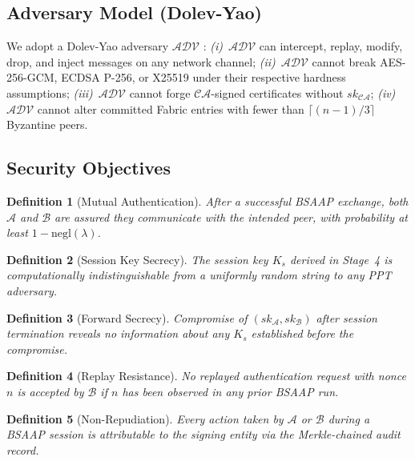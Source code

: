 \documentclass[review,5p,twocolumn,times]{elsarticle}
\newtheorem{definition}{Definition}[section]
\begin{document}
\subsection{Adversary Model (Dolev-Yao)}

We adopt a Dolev-Yao adversary $\mathcal{ADV}$ \cite{dolev1983security}:
\emph{(i)}~$\mathcal{ADV}$ can intercept, replay, modify, drop, and inject
messages on any network channel;
\emph{(ii)}~$\mathcal{ADV}$ cannot break AES-256-GCM, ECDSA P-256, or X25519
under their respective hardness assumptions;
\emph{(iii)}~$\mathcal{ADV}$ cannot forge $\mathcal{CA}$-signed certificates
without $sk_{\mathcal{CA}}$;
\emph{(iv)}~$\mathcal{ADV}$ cannot alter committed Fabric entries with fewer
than $\lceil(n-1)/3\rceil$ Byzantine peers.

\subsection{Security Objectives}

\begin{definition}[Mutual Authentication]\label{def:auth}
After a successful BSAAP exchange, both $\mathcal{A}$ and $\mathcal{B}$ are
assured they communicate with the intended peer, with probability at least
$1 - \mathrm{negl}(\lambda)$.
\end{definition}

\begin{definition}[Session Key Secrecy]\label{def:secrecy}
The session key $K_s$ derived in Stage~4 is computationally
indistinguishable from a uniformly random string to any PPT adversary.
\end{definition}

\begin{definition}[Forward Secrecy]\label{def:forward}
Compromise of $(sk_\mathcal{A}, sk_\mathcal{B})$ after session termination
reveals no information about any $K_s$ established before the compromise.
\end{definition}

\begin{definition}[Replay Resistance]\label{def:replay}
No replayed authentication request with nonce $n$ is accepted by $\mathcal{B}$
if $n$ has been observed in any prior BSAAP run.
\end{definition}

\begin{definition}[Non-Repudiation]\label{def:nonrep}
Every action taken by $\mathcal{A}$ or $\mathcal{B}$ during a BSAAP session
is attributable to the signing entity via the Merkle-chained audit record.
\end{definition}
\end{document}
